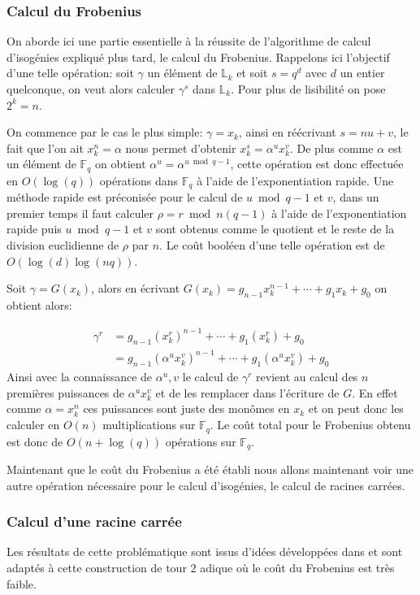 \documentclass[10pt,a4paper]{book}
\theoremstyle{plain}
\theoremstyle{definition}
\theoremstyle{definition}
\theoremstyle{definition}
\theoremstyle{definition}
\theoremstyle{remark}
\theoremstyle{remark}
\begin{document}
\subsubsection*{Calcul du Frobenius}
On aborde ici une partie essentielle à la réussite de l'algorithme de calcul d'isogénies expliqué plus tard, le calcul du Frobenius. Rappelons ici l'objectif d'une telle opération: soit $\gamma $ un élément de $\mathbb{L}_k$ et soit $s=q^d$ avec $d$ un entier quelconque, on veut alors calculer $\gamma^s$ dans $\mathbb{L}_k$. Pour plus de lisibilité on pose $2^k=n$.


On commence par le cas le plus simple: $\gamma=x_k$, ainsi en réécrivant $s=nu+v$, le fait que l'on ait $x_k^n=\alpha $ nous permet d'obtenir $x_k^s=\alpha^ux_k^v$. De plus comme $\alpha$ est un élément de $\mathbb{F}_q$ on obtient $\alpha^u=\alpha^{u \bmod q-1}$, cette opération est donc effectuée en $O(\log(q))$ opérations dans $\mathbb{F}_q$ à l'aide de l'exponentiation rapide. Une méthode rapide est préconisée pour le calcul de $u \bmod q-1$ et $v$, dans un premier temps il faut calculer $\rho=r \bmod n(q-1)$ à l'aide de l'exponentiation rapide puis $u \bmod q-1$ et $v$ sont obtenus comme le quotient et le reste de la division euclidienne de $\rho$ par $n$. Le coût booléen d'une telle opération est de $O(\log(d)\log(nq))$.

Soit  $\gamma=G(x_k)$, alors en écrivant $G(x_k)=g_{n-1}x_k^{n-1}+ \cdots + g_1 x_k + g_0$ on obtient alors:

\begin{align*}
\gamma^r &= g_{n-1}(x_k^r)^{n-1}+ \cdots + g_1 (x_k^r) + g_0 \\
         &= g_{n-1}(\alpha^ux_k^v)^{n-1}+ \cdots + g_1 (\alpha^ux_k^v) + g_0
\end{align*}
Ainsi avec la connaissance de $\alpha^u,v$ le calcul de $\gamma^r$ revient au calcul des $n$ premières puissances de $\alpha^ux_k^v$ et de les remplacer dans l'écriture de $G$. En effet comme $\alpha=x_k^n$ ces puissances sont juste des monômes en $x_k$ et on peut donc les calculer en $O(n)$ multiplications sur $\mathbb{F}_q$. Le coût total pour le Frobenius obtenu est donc de $O(n+ \log(q))$ opérations sur $\mathbb{F}_q$.

Maintenant que le coût du Frobenius a été établi nous allons maintenant voir une autre opération nécessaire pour le calcul d'isogénies, le calcul de racines carrées.

\subsubsection*{Calcul d'une racine carrée}
Les résultats de cette problématique sont issus d'idées développées dans \cite{Doliskani-Schost14} et sont adaptés à cette construction de tour $2$ adique où le coût du Frobenius est très faible. 
\end{document}
